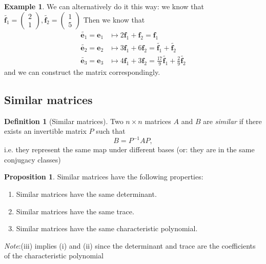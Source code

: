 \documentclass[a4paper]{article}
\theoremstyle{definition}
\newtheorem*{prop}{Proposition}
\newtheorem*{defi}{Definition}
\newtheorem*{eg}{Example}
\newcommand{\mb}[1]{\mathbf{#1}}
\newcommand{\note}{\noindent \emph{Note}:\;}
\begin{document}
\begin{eg}
  We can alternatively do it this way: we know that $\tilde{\mb{f}_1} = 
  \begin{pmatrix}
    2\\1
  \end{pmatrix}, \tilde{\mb{f}_2} = 
  \begin{pmatrix}
    1\\5
  \end{pmatrix}$
  Then we know that 
  \begin{align*}
    \tilde{\mb{e}_1} = \mb{e}_1 &\mapsto 2\mb{f}_1 + \mb{f}_2 = \mb{f}_1\\
    \tilde{\mb{e}_2} = \mb{e}_2 &\mapsto 3\mb{f}_1 + 6\mb{f}_2 = \tilde{\mb{f}_1} + \tilde{\mb{f}_2}\\
    \tilde{\mb{e}_3} = \mb{e}_3 &\mapsto 4\mb{f}_1 + 3\mb{f}_2 = \frac{17}{9} \tilde{\mb{f}_1} + \frac{2}{9}\tilde{\mb{f}_2}
  \end{align*}
  and we can construct the matrix correspondingly.
\end{eg}
\subsection{Similar matrices}
\begin{defi}[Similar matrices]
  Two $n\times n$ matrices $A$ and $B$ are \emph{similar} if there exists an invertible matrix $P$ such that
  \[
  B = P^{-1}AP,
  \]
  i.e. they represent the same map under different bases (or: they are in the same conjugacy classes)
\end{defi}

\begin{prop}
  Similar matrices have the following properties:
  \begin{enumerate}
  \item Similar matrices have the same determinant.
  \item Similar matrices have the same trace.
  \item Similar matrices have the same characteristic polynomial.
  \end{enumerate}
\end{prop}
\note (iii) implies (i) and (ii) since the determinant and trace are the coefficients of the characteristic polynomial
\end{document}
